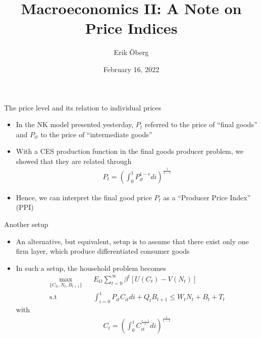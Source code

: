 \documentclass[9pt,xcolor={dvipsnames}]{beamer}
\title[NK: Topics]{Macroeconomics II: A Note on Price Indices}
\author{Erik {\"O}berg}
\date{February 16, 2022}
\newcommand{\bit}{\begin{itemize}}
\newcommand{\eit}{\end{itemize}}
\begin{document}
\begin{frame}
\maketitle
\end{frame}


\begin{frame}{The price level and its relation to individual prices}

\bit
\setlength\itemsep{1.5em} 

\item In the NK model presented yesterday, $P_t$ referred to the price of ``final goods'' and $P_{it}$ to the price of ``intermediate goods''

\item With a CES production function in the final goods producer problem, we showed that they are related through
\begin{eqnarray}
P_t =  \left(\int_{0}^{1} P_{it}^{1-\epsilon}  di\right)^{\frac{1}{1-\epsilon}} \nonumber
\end{eqnarray}

\item Hence, we can interpret the final good price $P_t$ as a ``Producer Price Index'' (PPI)

\eit

\end{frame}


\begin{frame}{Another setup}

\bit
\setlength\itemsep{1.5em} 

\item An alternative, but equivalent, setup is to assume that there exist only one firm layer, which produce differentiated consumer goods

\item In such a setup, the household problem becomes
\begin{eqnarray}
\max_{\{C_{it}, N_t, B_{t+1}\}} && E_O \sum_{t=0}^{\infty} \beta^t \left[U(C_t)- V(N_t) \right]\nonumber \\
\text{s.t} && \int_{i=0}^{1} P_{it} C_{it} di + Q_t B_{t+1} \leq W_t N_t + B_{t} + T_t \nonumber 
\end{eqnarray}
with
\begin{eqnarray}
C_t = \left(\int_{0}^{1} C_{it}^{\frac{\epsilon-1}{\epsilon}} di \right)^{\frac{\epsilon}{\epsilon-1}} \nonumber
\end{eqnarray}


\eit

\end{frame}
\end{document}

